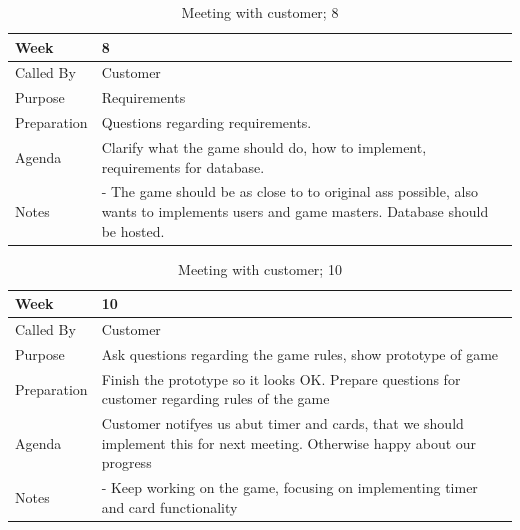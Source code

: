 {\footnotesize
\begin{table}[H]
\begin{tabular}{| p{5cm} | p{10cm} |}\hline
	\textbf{Week}	& \textbf{8} \\ \hline
	Called	By		& Customer\\ \hline
	Purpose		& Requirements\\ \hline
	Preparation 
		& Questions regarding requirements. \\ 
		
	Agenda
		& Clarify what the game should do, how to implement, requirements for database. \\

	Notes	& - The game should be as close to to original ass possible, also wants to implements users and game masters. Database should be hosted.\\ \hline
	
\end{tabular}


\caption{Meeting with customer; 8}
\label{fig:meeting_8}
\end{table}}


{\footnotesize
\begin{table}[H]
\begin{tabular}{| p{5cm} | p{10cm} |}\hline
	\textbf{Week}	& \textbf{10} \\ \hline
	Called	By		& Customer\\ \hline
	Purpose		& Ask questions regarding the game rules, show prototype of game\\ \hline
	Preparation 
		& Finish the prototype so it looks OK. Prepare questions for customer regarding rules of the game \\ 
		
	Agenda
		& Customer notifyes us abut timer and cards, that we should implement this for next meeting. Otherwise happy about our progress  \\

	Notes	& - Keep working on the game, focusing on implementing timer and card functionality\\ \hline
	
\end{tabular}


\caption{Meeting with customer; 10}
\label{fig:meeting_10}
\end{table}}



